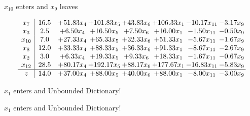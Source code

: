 \documentclass[9pt]{article}
\begin{document}
 $ x_{10} $ enters and $ x_{9} $ leaves 

 \[\begin{array}{c| c c@{\hskip 2pt} c@{\hskip 2pt} c@{\hskip 2pt} c@{\hskip 2pt} c@{\hskip 2pt} c@{\hskip 2pt} }
 x_{7}   &  16.5 & + 51.83 x_{4} & + 101.83 x_{5} & + 43.83 x_{6} & + 106.33 x_{1} & -10.17 x_{11} & -3.17 x_{9}\\
 x_{3}   &  2.5 & +  6.50 x_{4} & + 16.50 x_{5} & +  7.50 x_{6} & + 16.00 x_{1} & -1.50 x_{11} & -0.50 x_{9}\\
 x_{10}   &  7.0 & + 27.33 x_{4} & + 65.33 x_{5} & + 32.33 x_{6} & + 51.33 x_{1} & -5.67 x_{11} & -1.67 x_{9}\\
 x_{8}   &  12.0 & + 33.33 x_{4} & + 88.33 x_{5} & + 36.33 x_{6} & + 91.33 x_{1} & -8.67 x_{11} & -2.67 x_{9}\\
 x_{2}   &  3.0 & +  6.33 x_{4} & + 19.33 x_{5} & +  9.33 x_{6} & + 18.33 x_{1} & -1.67 x_{11} & -0.67 x_{9}\\
 x_{12}   &  28.5 & + 80.17 x_{4} & + 192.17 x_{5} & + 88.17 x_{6} & + 177.67 x_{1} & -16.83 x_{11} & -5.83 x_{9}\\
\hline
z    &  14.0 & + 37.00 x_{4} & + 88.00 x_{5} & + 40.00 x_{6} & + 88.00 x_{1} & -8.00 x_{11} & -3.00 x_{9}\\
\end{array}\]


 $ x_{1} $ enters and Unbounded Dictionary!


 $ x_{1} $ enters and Unbounded Dictionary!
\end{document}
